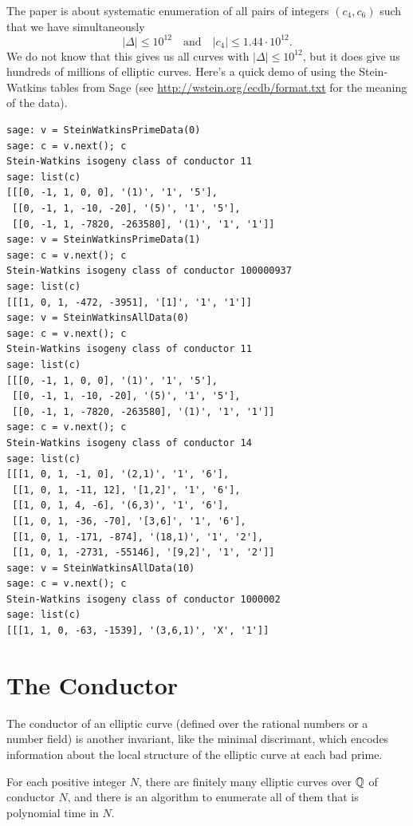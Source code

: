 \documentclass{book}
\begin{document}
The paper \cite{stein-watkins:ants5} is about systematic
enumeration of all pairs of integers $(c_4,c_6)$ such that
we have simultaneously
$$
|\Delta| \leq 10^{12} \quad\text{and}\quad
|c_4|\leq 1.44\cdot 10^{12}.
$$
We do not know that this gives us all curves with $|\Delta|\leq 10^{12}$,
but it does give us hundreds of millions of elliptic curves.
Here's a quick demo of using the Stein-Watkins tables from Sage
(see \url{http://wstein.org/ecdb/format.txt} for the meaning of the data).
\begin{lstlisting}
sage: v = SteinWatkinsPrimeData(0)
sage: c = v.next(); c
Stein-Watkins isogeny class of conductor 11
sage: list(c)
[[[0, -1, 1, 0, 0], '(1)', '1', '5'],
 [[0, -1, 1, -10, -20], '(5)', '1', '5'],
 [[0, -1, 1, -7820, -263580], '(1)', '1', '1']]
sage: v = SteinWatkinsPrimeData(1)
sage: c = v.next(); c
Stein-Watkins isogeny class of conductor 100000937
sage: list(c)
[[[1, 0, 1, -472, -3951], '[1]', '1', '1']]
sage: v = SteinWatkinsAllData(0)
sage: c = v.next(); c
Stein-Watkins isogeny class of conductor 11
sage: list(c)
[[[0, -1, 1, 0, 0], '(1)', '1', '5'],
 [[0, -1, 1, -10, -20], '(5)', '1', '5'],
 [[0, -1, 1, -7820, -263580], '(1)', '1', '1']]
sage: c = v.next(); c
Stein-Watkins isogeny class of conductor 14
sage: list(c)
[[[1, 0, 1, -1, 0], '(2,1)', '1', '6'],
 [[1, 0, 1, -11, 12], '[1,2]', '1', '6'],
 [[1, 0, 1, 4, -6], '(6,3)', '1', '6'],
 [[1, 0, 1, -36, -70], '[3,6]', '1', '6'],
 [[1, 0, 1, -171, -874], '(18,1)', '1', '2'],
 [[1, 0, 1, -2731, -55146], '[9,2]', '1', '2']]
sage: v = SteinWatkinsAllData(10)
sage: c = v.next(); c
Stein-Watkins isogeny class of conductor 1000002
sage: list(c)
[[[1, 1, 0, -63, -1539], '(3,6,1)', 'X', '1']]
\end{lstlisting}


\newpage
\section{The Conductor}
The conductor of an elliptic curve (defined over the rational numbers
or a number field) is another
invariant, like the minimal discrimant,
which encodes information about the local structure
of the elliptic curve at each bad prime.

\begin{theorem}
For each positive integer $N$,
there are finitely many elliptic curves over $\mathbb{Q}$
of conductor $N$, and there is an algorithm
to enumerate all of them that is polynomial
time in $N$.
\end{theorem}
\end{document}
